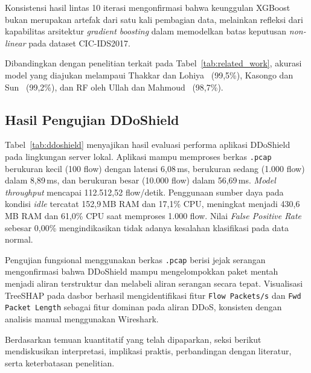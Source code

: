 \documentclass[conference,a4paper]{IEEEtran}
\begin{document}
Konsistensi hasil lintas 10 iterasi mengonfirmasi bahwa keunggulan XGBoost bukan merupakan artefak dari satu kali pembagian data, melainkan refleksi dari kapabilitas arsitektur \textit{gradient boosting} dalam memodelkan batas keputusan \textit{non-linear} pada dataset CIC-IDS2017.

Dibandingkan dengan penelitian terkait pada Tabel~\ref{tab:related_work}, akurasi model yang diajukan
melampaui Thakkar dan Lohiya~\cite{ref_thakkar2020} (99,5\%), Kasongo dan Sun~\cite{ref_kasongo2020} (99,2\%),
dan RF oleh Ullah dan Mahmoud~\cite{ref_ullah2020} (98,7\%).

\subsection{Hasil Pengujian DDoShield}

Tabel~\ref{tab:ddoshield} menyajikan hasil evaluasi performa aplikasi DDoShield pada lingkungan server lokal. Aplikasi mampu memproses berkas \texttt{.pcap} berukuran kecil (100 flow) dengan latensi 6,08\,ms,
berukuran sedang (1.000 flow) dalam 8,89\,ms, dan berukuran besar (10.000 flow) dalam 56,69\,ms. \textit{Model throughput} mencapai 112.512,52 flow/detik. Penggunaan sumber daya pada kondisi \textit{idle} tercatat 152,9\,MB RAM dan 17,1\% CPU, meningkat menjadi 430,6\,MB RAM dan 61,0\% CPU saat memproses 1.000 flow. Nilai \textit{False Positive Rate} sebesar 0,00\% mengindikasikan tidak adanya kesalahan klasifikasi pada data normal.

Pengujian fungsional menggunakan berkas \texttt{.pcap} berisi jejak serangan mengonfirmasi bahwa DDoShield mampu mengelompokkan paket mentah menjadi aliran terstruktur dan melabeli aliran serangan secara tepat. Visualisasi TreeSHAP pada dasbor berhasil mengidentifikasi fitur \texttt{Flow Packets/s} dan \texttt{Fwd Packet Length} sebagai fitur dominan pada aliran DDoS, konsisten dengan analisis manual menggunakan Wireshark.

Berdasarkan temuan kuantitatif yang telah dipaparkan, seksi berikut mendiskusikan interpretasi, implikasi praktis, perbandingan dengan literatur, serta keterbatasan penelitian.
\end{document}
